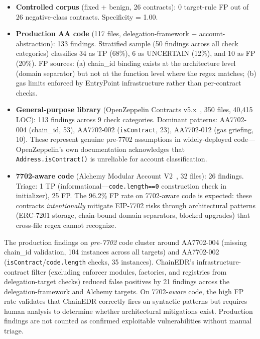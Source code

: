 \begin{itemize}
    \item \textbf{Controlled corpus} (fixed + benign, 26 contracts): 0 target-rule FP out of 26 negative-class contracts. Specificity = 1.00.
    \item \textbf{Production AA code} (117 files, delegation-framework + account-abstraction): 133 findings. Stratified sample (50 findings across all check categories) classifies 34 as TP (68\%), 6 as UNCERTAIN (12\%), and 10 as FP (20\%). FP sources: (a) chain\_id binding exists at the architecture level (domain separator) but not at the function level where the regex matches; (b) gas limits enforced by EntryPoint infrastructure rather than per-contract checks.
    \item \textbf{General-purpose library} (OpenZeppelin Contracts v5.x~\cite{oz_contracts}, 350 files, 40{,}415 LOC): 113 findings across 9 check categories. Dominant patterns: AA7702-004 (chain\_id, 53), AA7702-002 (\texttt{isContract}, 23), AA7702-012 (gas griefing, 10). These represent genuine pre-7702 assumptions in widely-deployed code---OpenZeppelin's own documentation acknowledges that \texttt{Address.isContract()} is unreliable for account classification.
    \item \textbf{7702-aware code} (Alchemy Modular Account V2~\cite{alchemy_modular}, 32 files): 26 findings. Triage: 1 TP (informational---\texttt{code.length==0} construction check in initializer), 25 FP. The 96.2\% FP rate on 7702-aware code is expected: these contracts \textit{intentionally} mitigate EIP-7702 risks through architectural patterns (ERC-7201 storage, chain-bound domain separators, blocked upgrades) that cross-file regex cannot recognize.
\end{itemize}

The production findings on \textit{pre-7702} code cluster around AA7702-004 (missing chain\_id validation, 104 instances across all targets) and AA7702-002 (\texttt{isContract}/\texttt{code.length} checks, 35 instances). ChainEDR's infrastructure-contract filter (excluding enforcer modules, factories, and registries from delegation-target checks) reduced false positives by 21 findings across the delegation-framework and Alchemy targets. On 7702-\textit{aware} code, the high FP rate validates that ChainEDR correctly fires on syntactic patterns but requires human analysis to determine whether architectural mitigations exist. Production findings are not counted as confirmed exploitable vulnerabilities without manual triage.

